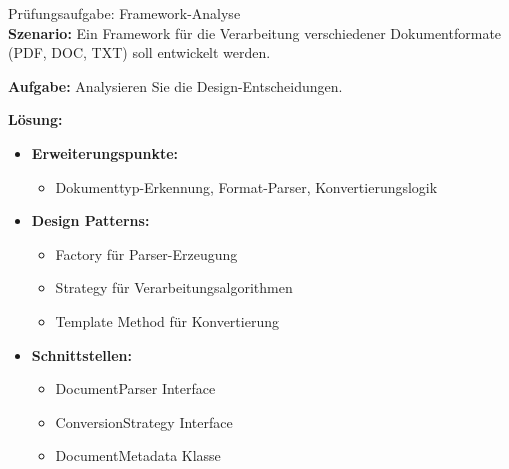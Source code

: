 \begin{example2}{Prüfungsaufgabe: Framework-Analyse}\\
\textbf{Szenario:}
Ein Framework für die Verarbeitung verschiedener Dokumentformate (PDF, DOC, TXT) 
soll entwickelt werden.

\textbf{Aufgabe:}
Analysieren Sie die Design-Entscheidungen.

\textbf{Lösung:}
\begin{itemize}
    \item \textbf{Erweiterungspunkte:}
    \begin{itemize}
        \item Dokumenttyp-Erkennung, Format-Parser, Konvertierungslogik
    \end{itemize}
    
    \item \textbf{Design Patterns:}
    \begin{itemize}
        \item Factory für Parser-Erzeugung
        \item Strategy für Verarbeitungsalgorithmen
        \item Template Method für Konvertierung
    \end{itemize}
    
    \item \textbf{Schnittstellen:}
    \begin{itemize}
        \item DocumentParser Interface
        \item ConversionStrategy Interface
        \item DocumentMetadata Klasse
    \end{itemize}
\end{itemize}
\end{example2}

